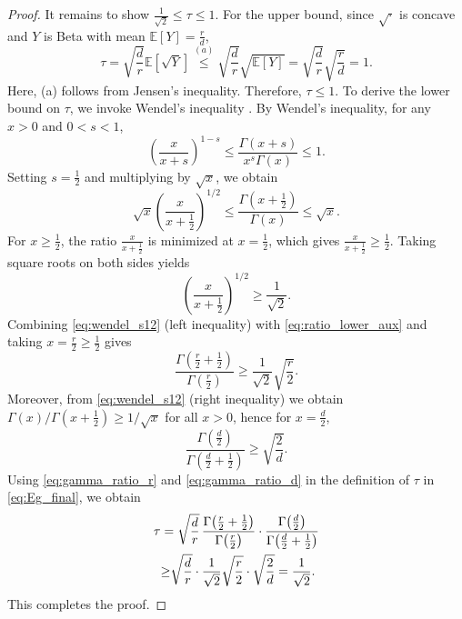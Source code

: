 \documentclass[10pt]{article}
\begin{document}
\begin{proof}
It remains to show $\frac{1}{\sqrt2}\le \tau \le 1$.
For the upper bound, since $\sqrt{\cdot}$ is concave and $Y$ is Beta with mean $\mathbb{E}[Y]=\frac{r}{d}$,
\begin{equation}\label{eq:tau_upper}
\tau
=\sqrt{\frac{d}{r}}\mathbb{E}[\sqrt{Y}]
\overset{(a)}{\le}
\sqrt{\frac{d}{r}}\sqrt{\mathbb{E}[Y]}
=
\sqrt{\frac{d}{r}}\sqrt{\frac{r}{d}}
=1.
\end{equation}
Here, (a) follows from Jensen's inequality.
Therefore, $\tau \le 1$.
To derive the lower bound on $\tau$, we invoke Wendel's inequality \cite{wendel1948}.
By Wendel's inequality, for any $x>0$ and $0<s<1$,
\[
\left(\frac{x}{x+s}\right)^{1-s}\le \frac{\Gamma(x+s)}{x^s\Gamma(x)}\le 1.
\]
Setting $s=\frac12$ and multiplying by $\sqrt{x}$, we obtain
\begin{equation}\label{eq:wendel_s12}
\sqrt{x}\left(\frac{x}{x+\frac12}\right)^{1/2}
\le
\frac{\Gamma\!\left(x+\frac12\right)}{\Gamma(x)}
\le
\sqrt{x}.
\end{equation}
For $x \ge \tfrac12$, the ratio $\frac{x}{x+\frac12}$ is minimized at $x=\tfrac12$,
which gives $\frac{x}{x+\frac12}\ge \frac12$.
Taking square roots on both sides yields
\begin{equation}\label{eq:ratio_lower_aux}
\left(\frac{x}{x+\frac12}\right)^{1/2}\ge \frac{1}{\sqrt2}.
\end{equation}
Combining \eqref{eq:wendel_s12} (left inequality) with \eqref{eq:ratio_lower_aux} and taking $x=\frac{r}{2}\ge \frac12$ gives
\begin{equation}\label{eq:gamma_ratio_r}
\frac{\Gamma\!\left(\frac{r}{2}+\frac12\right)}{\Gamma\!\left(\frac{r}{2}\right)}
\overset{}{\ge}
\frac{1}{\sqrt2}\sqrt{\frac{r}{2}}.
\end{equation}
Moreover, from \eqref{eq:wendel_s12} (right inequality) we obtain
$\Gamma(x)/\Gamma(x+\frac12)\ge 1/\sqrt{x}$ for all $x>0$, hence for $x=\frac{d}{2}$,
\begin{equation}\label{eq:gamma_ratio_d}
\frac{\Gamma\!\left(\frac{d}{2}\right)}{\Gamma\!\left(\frac{d}{2}+\frac12\right)}
\overset{}{\ge}
\sqrt{\frac{2}{d}}.
\end{equation}
Using \eqref{eq:gamma_ratio_r} and \eqref{eq:gamma_ratio_d} in the definition of $\tau$ in \eqref{eq:Eg_final}, we obtain
\begin{align}
\tau
&=
\sqrt{\frac{d}{r}}\,
\frac{\Gamma\!\left(\frac{r}{2}+\frac12\right)}{\Gamma\!\left(\frac{r}{2}\right)}
\cdot
\frac{\Gamma\!\left(\frac{d}{2}\right)}{\Gamma\!\left(\frac{d}{2}+\frac12\right)}
\notag\\
&{\ge}
\sqrt{\frac{d}{r}}
\cdot
\frac{1}{\sqrt2}\sqrt{\frac{r}{2}}
\cdot
\sqrt{\frac{2}{d}}
=\frac{1}{\sqrt2}.
\label{eq:tau_lower}
\end{align}
This completes the proof.
\end{proof}
\end{document}
